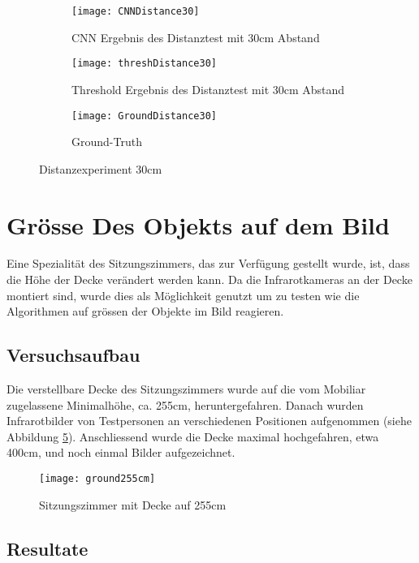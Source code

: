 \begin{figure}[H]
	\begin{subfigure}{.45\linewidth}
		\centering
		\texttt{[image: CNNDistance30]}
		\caption{\gls{CNN} Ergebnis des Distanztest mit 30cm Abstand}
		\label{fig:cnnDistance30}
	\end{subfigure}\hfill%
	\begin{subfigure}{.45\linewidth}
		\centering
		\texttt{[image: threshDistance30]}
		\caption{Threshold Ergebnis des Distanztest mit 30cm Abstand}
		\label{fig:thresholdDistance30}
	\end{subfigure}\hfill%
	\begin{subfigure}{\linewidth}
		\centering
		\texttt{[image: GroundDistance30]}
		\caption{Ground-Truth}
		\label{fig:groundDistance30}
	\end{subfigure}
	\caption{Distanzexperiment 30cm}
	\label{fig:Distance30}
\end{figure}

\section{Grösse Des Objekts auf dem Bild}
\label{sec:objectSize}
Eine Spezialität des Sitzungszimmers, das zur Verfügung gestellt wurde, ist, dass die Höhe der Decke verändert werden kann. Da die Infrarotkameras an der Decke montiert sind, wurde dies als Möglichkeit genutzt um zu testen wie die Algorithmen auf grössen der Objekte im Bild reagieren. 

\subsection{Versuchsaufbau}

Die verstellbare Decke des Sitzungszimmers wurde auf die vom Mobiliar zugelassene Minimalhöhe, ca. 255cm, heruntergefahren. Danach wurden Infrarotbilder von Testpersonen an verschiedenen Positionen aufgenommen (siehe Abbildung \ref{fig:ground255cm}). Anschliessend wurde die Decke maximal hochgefahren, etwa 400cm, und noch einmal Bilder aufgezeichnet.

\begin{figure}[H]
	\centering
	\texttt{[image: ground255cm]}
	\caption{Sitzungszimmer mit Decke auf 255cm}
	\label{fig:ground255cm}
\end{figure}

\subsection{Resultate}


